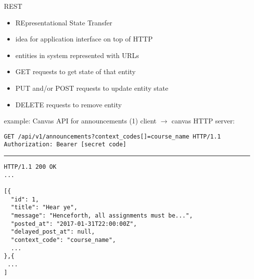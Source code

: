 \begin{frame}{REST}
    \begin{itemize}
    \item REpresentational State Transfer
    \item idea for application interface on top of HTTP
    \vspace{.5cm}
    \item entities in system represented with URLs
    \item GET requests to get state of that entity
    \item PUT and/or POST requests to update entity state
    \item DELETE requests to remove entity
    \end{itemize}
\end{frame}

\begin{frame}[fragile]{example: Canvas API for announcements (1)}
client $\rightarrow$ canvas HTTP server:
\begin{Verbatim}[fontsize=\fontsize{9}{10}\selectfont]
GET /api/v1/announcements?context_codes[]=course_name HTTP/1.1
Authorization: Bearer [secret code]
\end{Verbatim}
\rule{0.9\textwidth}{1mm}
\begin{Verbatim}[fontsize=\fontsize{9}{10}\selectfont]
HTTP/1.1 200 OK
...

[{
  "id": 1,
  "title": "Hear ye",
  "message": "Henceforth, all assignments must be...",
  "posted_at": "2017-01-31T22:00:00Z",
  "delayed_post_at": null,
  "context_code": "course_name",
  ...
},{
 ...
]
\end{Verbatim}
\end{frame}

